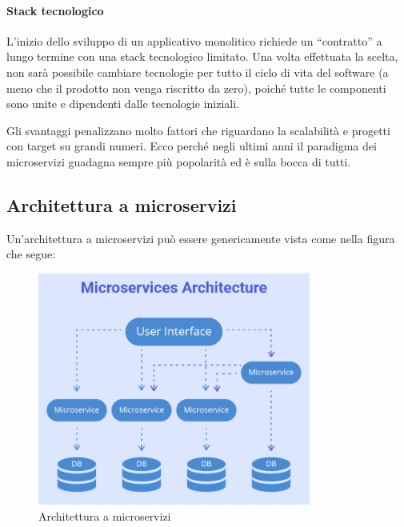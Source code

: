 \paragraph*{Stack tecnologico} L'inizio dello sviluppo di un applicativo monolitico richiede un ``contratto'' a lungo termine con una stack tecnologico limitato. Una volta effettuata la scelta, non sarà possibile cambiare tecnologie per tutto il ciclo di vita del software (a meno che il prodotto non venga riscritto da zero), poiché tutte le componenti sono unite e dipendenti dalle tecnologie iniziali.

Gli svantaggi penalizzano molto fattori che riguardano la scalabilità
e progetti con target su grandi numeri.
Ecco perché negli ultimi anni il paradigma dei microservizi guadagna
sempre più popolarità ed è sulla bocca di tutti.



\subsection{Architettura a microservizi}

Un'architettura a microservizi può essere genericamente vista come
nella figura che segue:

\begin{figure}[H]
	\centering
	\includegraphics[width=0.8\textwidth]{immagini/microservices_architecture.png} %
	\caption[Architettura a microservizi]{Architettura  a microservizi\footnotemark}
	\label{fig:microservices-arch}
\end{figure}

